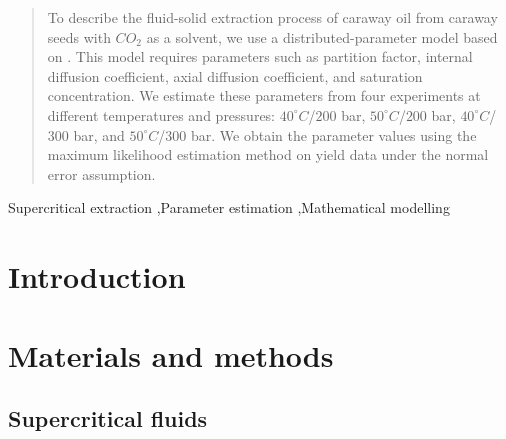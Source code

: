 \documentclass[a4paper,fleqn]{cas-dc}
\begin{document}
\begin{abstract}
To describe the fluid-solid extraction process of caraway oil from caraway seeds with $CO_2$ as a solvent, we use a distributed-parameter model based on \citet{Reverchon1996}. This model requires parameters such as partition factor, internal diffusion coefficient, axial diffusion coefficient, and saturation concentration. We estimate these parameters from four experiments at different temperatures and pressures: $40^\circ C$/$200$ bar, $50^\circ C$/$200$ bar, $40^\circ C$/$300$ bar, and $50^\circ C$/$300$ bar. We obtain the parameter values using the maximum likelihood estimation method on yield data under the normal error assumption.

\end{abstract}

\begin{keywords}
Supercritical extraction \sep Parameter estimation \sep Mathematical modelling
\end{keywords}

\maketitle


\section{Introduction}
%


\section{Materials and methods} \label{CH: Materials and methods}

\subsection{Supercritical fluids} \label{CH: Thermodynamic}
%


%
\end{document}
